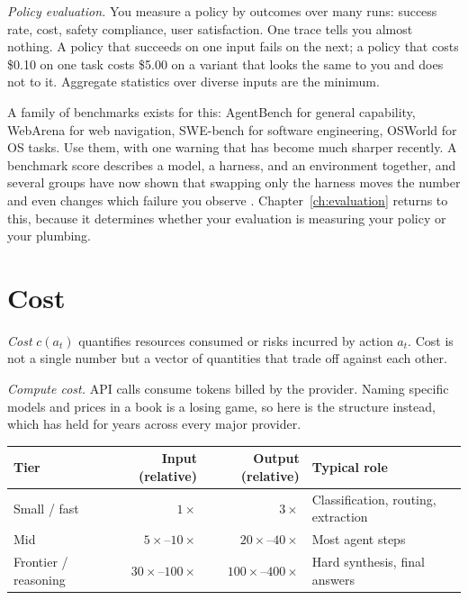 \textit{Policy evaluation.} You measure a policy by outcomes over many runs: success rate, cost, safety compliance, user satisfaction. One trace tells you almost nothing. A policy that succeeds on one input fails on the next; a policy that costs \$0.10 on one task costs \$5.00 on a variant that looks the same to you and does not to it. Aggregate statistics over diverse inputs are the minimum.

A family of benchmarks exists for this: AgentBench \cite{liu2023agentbench} for general capability, WebArena \cite{zhou2024webarena} for web navigation, SWE-bench \cite{jimenez2024swebench} for software engineering, OSWorld \cite{xie2024osworld} for OS tasks. Use them, with one warning that has become much sharper recently. A benchmark score describes a model, a harness, and an environment together, and several groups have now shown that swapping only the harness moves the number and even changes which failure you observe \cite{modelharness2026, harnessdiverge2026, uniace2026}. Chapter~\ref{ch:evaluation} returns to this, because it determines whether your evaluation is measuring your policy or your plumbing.

\section{Cost}

\emph{Cost} $c(a_t)$ quantifies resources consumed or risks incurred by action $a_t$. Cost is not a single number but a vector of quantities that trade off against each other.

\textit{Compute cost.} API calls consume tokens billed by the provider. Naming specific models and prices in a book is a losing game, so here is the structure instead, which has held for years across every major provider.

\begin{center}
\begin{tabular}{lrrl}
\toprule
Tier & Input (relative) & Output (relative) & Typical role \\
\midrule
Small / fast & $1\times$ & $3\times$ & Classification, routing, extraction \\
Mid & $5\times$--$10\times$ & $20\times$--$40\times$ & Most agent steps \\
Frontier / reasoning & $30\times$--$100\times$ & $100\times$--$400\times$ & Hard synthesis, final answers \\
\bottomrule
\end{tabular}
\end{center}

